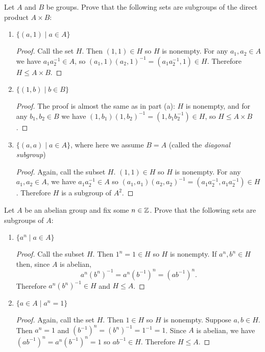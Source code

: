  Let $A$ and $B$ be groups. Prove that the following sets
are subgroups of the direct product $A\times B$:
\begin{enumerate}
\item $\{(a, 1) \mid a\in A\}$
  \begin{proof}
    Call the set $H$. Then $(1,1)\in H$ so $H$ is nonempty. For any
    $a_1,a_2\in A$ we have $a_1a_2^{-1}\in A$, so
    $(a_1,1)(a_2,1)^{-1} = (a_1a_2^{-1}, 1)\in H$. Therefore
    $H\leq A\times B$.
  \end{proof}
\item $\{(1, b) \mid b\in B\}$
  \begin{proof}
    The proof is almost the same as in part (a): $H$ is nonempty, and
    for any $b_1,b_2\in B$ we have
    $(1,b_1)(1,b_2)^{-1} = (1,b_1b_2^{-1})\in H$, so
    $H\leq A\times B$.
  \end{proof}
\item $\{(a, a) \mid a\in A\}$, where here we assume $B = A$ (called
  the {\em diagonal subgroup})
  \begin{proof}
    Again, call the subset $H$. $(1,1)\in H$ so $H$ is nonempty. For
    any $a_1,a_2\in A$, we have $a_1a_2^{-1}\in A$ so
    $(a_1,a_1)(a_2,a_2)^{-1} = (a_1a_2^{-1}, a_1a_2^{-1})\in
    H$. Therefore $H$ is a subgroup of $A^2$.
  \end{proof}
\end{enumerate}

 Let $A$ be an abelian group and fix some $n\in\mathbb{Z}$. Prove
that the following sets are subgroups of $A$:
\begin{enumerate}
\item $\{a^n \mid a\in A\}$
  \begin{proof}
    Call the subset $H$. Then $1^n = 1\in H$ so $H$ is nonempty. If
    $a^n,b^n\in H$ then, since $A$ is abelian,
    \begin{equation*}
      a^n(b^n)^{-1} = a^n(b^{-1})^n = (ab^{-1})^n.
    \end{equation*}
    Therefore $a^n(b^n)^{-1}\in H$ and $H\leq A$.
  \end{proof}
\item $\{a\in A\mid a^n = 1\}$
  \begin{proof}
    Again, call the set $H$. Then $1\in H$ so $H$ is nonempty. Suppose
    $a,b\in H$. Then $a^n = 1$ and
    $(b^{-1})^n = (b^n)^{-1} = 1^{-1} = 1$. Since $A$ is abelian, we
    have $(ab^{-1})^n = a^n(b^{-1})^n = 1$ so $ab^{-1}\in
    H$. Therefore $H\leq A$.
  \end{proof}
\end{enumerate}
